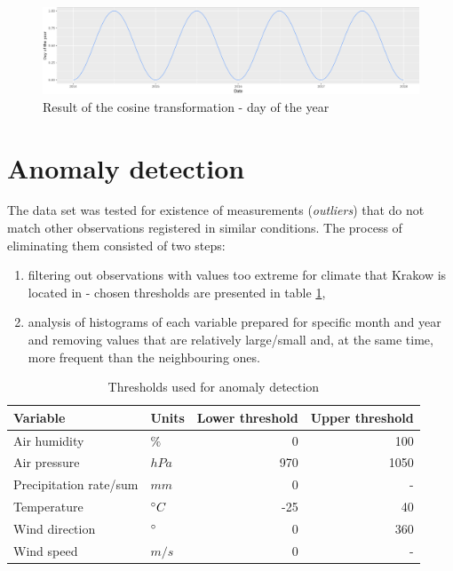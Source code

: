 \begin{figure}[htp]
\centering
\includegraphics[width=\textwidth]{figures/dataset/fraction_of_period.png}
\caption{Result of the cosine transformation - day of the year}
\label{fig:dataset-cosine-transformation}
\end{figure}


\section{Anomaly detection}
The data set was tested for existence of measurements (\textit{outliers}) that do not match other observations registered in similar conditions. The process of eliminating them consisted of two steps:
\begin{enumerate}
    \item filtering out observations with values too extreme for climate that Krakow is located in - chosen thresholds are presented in table \ref{tab:dataset-anomaly-thresholds},
    \item analysis of histograms of each variable prepared for specific month and year and removing values that are relatively large/small and, at the same time, more frequent than the neighbouring ones.
\end{enumerate}

\begin{table}[H]
\centering
\caption{Thresholds used for anomaly detection}
\label{tab:dataset-anomaly-thresholds}
\begin{tabular}{llrr}
\toprule
Variable               & Units       & Lower threshold & Upper threshold \\ \midrule
Air humidity           & $\%$        & 0               & 100             \\
Air pressure           & $hPa$       & 970             & 1050            \\
Precipitation rate/sum & $mm$        & 0               & -               \\
Temperature            & $\degree C$ & -25             & 40              \\ 
Wind direction         & $\degree$   & 0               & 360             \\
Wind speed             & $m/s$       & 0               & -               \\ 
\bottomrule
\end{tabular}
\end{table}

